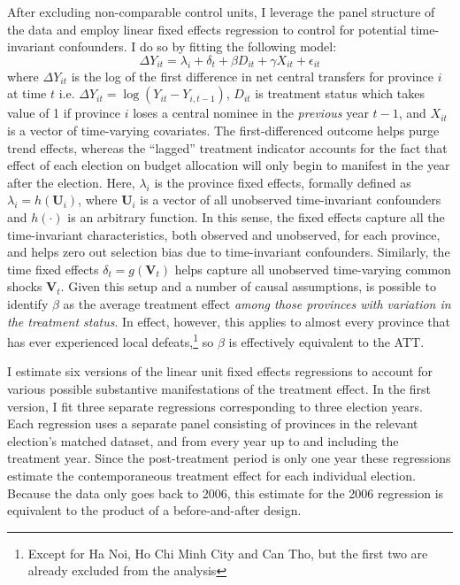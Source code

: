 \documentclass[12pt]{article}\usepackage[]{graphicx}\usepackage[]{color}
\newcommand{\1}{\mathbbm{1}}
\begin{document}
After excluding non-comparable control units, I leverage the panel structure of the data and employ linear fixed effects regression to control for potential time-invariant confounders. I do so by fitting the following model:
\begin{equation}
\Delta Y_{it} = \lambda_i + \delta_t + \beta D_{it} + \gamma X_{it} + \epsilon_{it} \tag{FE}\label{eq:FE}
\end{equation}
where $\Delta Y_{it}$ is the log of the first difference in net central transfers for province $i$ at time $t$ i.e. $\Delta Y_{it} = \log(Y_{it} - Y_{i, t-1})$, $D_{it}$ is treatment status which takes value of 1 if province $i$ loses a central nominee in the \textit{previous} year $t-1$, and $X_{it}$ is a vector of time-varying covariates. The first-differenced outcome helps purge trend effects, whereas the ``lagged'' treatment indicator accounts for the fact that effect of each election on budget allocation will only begin to manifest in the year after the election. Here, $\lambda_i$ is the province fixed effects, formally defined as $\lambda_i= h(\mathbf{U}_i)$, where $\mathbf{U}_i$ is a vector of all unobserved time-invariant confounders and $h(\cdot)$ is an arbitrary function. In this sense, the fixed effects capture all the time-invariant characteristics, both observed and unobserved, for each province, and helps zero out selection bias due to time-invariant confounders. Similarly, the time fixed effects $\delta_t = g(\mathbf{V}_t)$ helps capture all unobserved time-varying common shocks $\mathbf{V}_t$. Given this setup and a number of causal assumptions, is possible to identify $\beta$ as the average treatment effect \textit{among those provinces with variation in the treatment status}. In effect, however, this applies to almost every province that has ever experienced local defeats,\footnote{Except for Ha Noi, Ho Chi Minh City and Can Tho, but the first two are already excluded from the analysis} so $\beta$ is effectively equivalent to the ATT.

I estimate six versions of the linear unit fixed effects regressions to account for various possible substantive manifestations of the treatment effect. In the first version, I fit three separate regressions corresponding to three election years. Each regression uses a separate panel consisting of provinces in the relevant election's matched dataset, and from every year up to and including the treatment year. Since the post-treatment period is only one year these regressions estimate the contemporaneous treatment effect for each individual election. Because the data only goes back to 2006, this estimate for the 2006 regression is equivalent to the product of a before-and-after design. 
\end{document}
